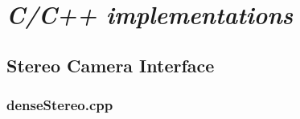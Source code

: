 \chapter{\emph{C/C++ implementations}}

\section{Stereo Camera Interface}
\label{app:stereo-camera}


\lstset{%
    language=C++,
    basicstyle=\scriptsize, %
    stringstyle=\ttfamily, %
    showstringspaces=false} %


\subsection{denseStereo.cpp}

